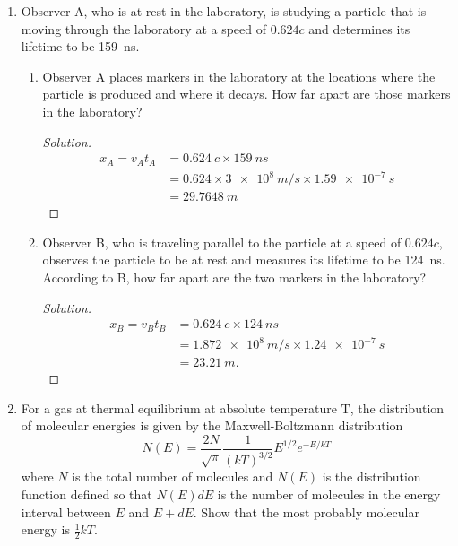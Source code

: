 
\begin{enumerate}
\item Observer A, who is at rest in the laboratory, is studying a particle that is moving through the laboratory at a speed of $0.624 c$ and determines its lifetime to be \SI{159}{\nano\second}.
	\begin{enumerate}
		\item Observer A places markers in the laboratory at the locations where the particle is produced and where it decays. How far apart are those markers in the laboratory?
\begin{proof}[Solution]
	\begin{align*}
		x_A = v_A t_A &= \SI{0.624}{c} \times \SI{159}{ns}\\
		&= 0.624\times \SI{3e8}{m\per s} \times \SI{1.59e-7}{s} \\
		&= \SI{29.7648}{m}
	\end{align*}
\end{proof}

	\item Observer B, who is traveling parallel to the particle at a speed of $0.624 c$, observes the particle to be at rest and measures its lifetime to be \SI{124}{\nano\second}. According to B, how far apart are the two markers in the laboratory?
\begin{proof}[Solution]
	\begin{align*}
		x_B = v_B t_B &= \SI{0.624}{c} \times \SI{124}{ns} \\
		&= \SI{1.872e8}{m \per s}\times  \SI{1.24e-7}{s} \\
		&= \SI{23.21}{m}
	.\end{align*}
\end{proof}

	\end{enumerate}
\item For a gas at thermal equilibrium at absolute temperature $\mathrm{T}$, the distribution of molecular energies is given by the Maxwell-Boltzmann distribution
\[
N(E)=\frac{2 N}{\sqrt{\pi}} \frac{1}{(k T)^{3 / 2}} E^{1 / 2} e^{-E / k T}
\]
where $N$ is the total number of molecules and $N(E)$ is the distribution function defined so that $N(E) d E$ is the number of molecules in the energy interval between $E$ and $E+d E$. Show that the most probably molecular energy is $\frac{1}{2} k T$.


\end{enumerate}
